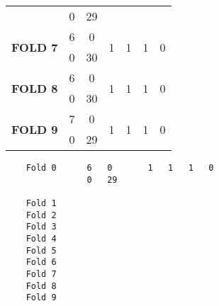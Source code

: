 \begin{table}[htbp]
\begin{tabular}{rcccccc}
    \multicolumn{1}{c}{} & 0     & 29    &       &       &       &  \\
    \multicolumn{1}{c}{\multirow{2}[1]{*}{\textbf{FOLD 7}}} & 6     & 0     & \multirow{2}[1]{*}{1} & \multirow{2}[1]{*}{1} & \multirow{2}[1]{*}{1} & \multirow{2}[1]{*}{0} \\
    \multicolumn{1}{c}{} & 0     & 30    &       &       &       &  \\
    \multicolumn{1}{c}{\multirow{2}[2]{*}{\textbf{FOLD 8}}} & 6     & 0     & \multirow{2}[2]{*}{1} & \multirow{2}[2]{*}{1} & \multirow{2}[2]{*}{1} & \multirow{2}[2]{*}{0} \\
    \multicolumn{1}{c}{} & 0     & 30    &       &       &       &  \\
    \multicolumn{1}{c}{\multirow{2}[2]{*}{\textbf{FOLD 9}}} & 7     & 0     & \multirow{2}[2]{*}{1} & \multirow{2}[2]{*}{1} & \multirow{2}[2]{*}{1} & \multirow{2}[2]{*}{0} \\
    \multicolumn{1}{c}{} & 0     & 29    &       &       &       &  \\
    \bottomrule
    \end{tabular}%
  \label{tab:addlabel}%
\end{table}

\begin{verbatim}
	Fold 0 		6	0		1	1	1	0
				0	29	
	
	Fold 1
	Fold 2
	Fold 3	
	Fold 4
	Fold 5
	Fold 6
	Fold 7
	Fold 8
	Fold 9
\end{verbatim}